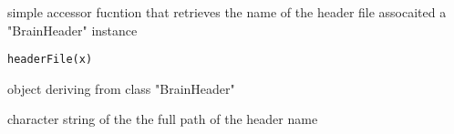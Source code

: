 \begin{Description}\relax
simple accessor fucntion that retrieves the name of the header file
assocaited a "BrainHeader" instance
\end{Description}
\begin{Usage}
\begin{verbatim}
headerFile(x)
\end{verbatim}
\end{Usage}
\begin{Arguments}
\begin{ldescription}
\item[\code{x}] object deriving from class "BrainHeader" 
\end{ldescription}
\end{Arguments}
\begin{Value}
character string of the the full path of the header name
\end{Value}

